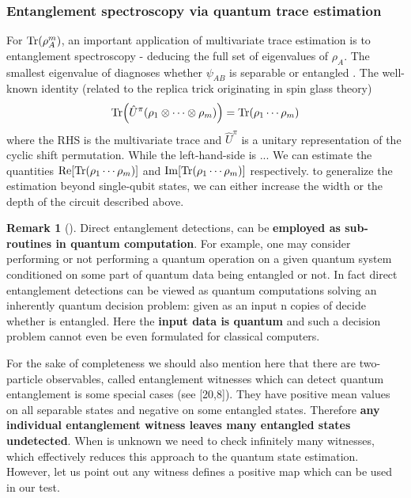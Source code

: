 \documentclass[
10pt,
aps,
pra,
linenumbers,
floatfix,
]{revtex4-2}
\theoremstyle{plain}
\theoremstyle{definition}
\newtheorem{remark}{Remark}
\newcommand{\U}{\hat{U}}
\newcommand{\dm}{\rho}
\begin{document}
\subsubsection{Entanglement spectroscopy via quantum trace estimation}
For $\Tr(\dm_A^m)$, an important application of multivariate trace estimation \cite{quekMultivariateTraceEstimation2022} is to entanglement spectroscopy \cite{ekertDirectEstimationsLinear2002} \cite{johriEntanglementSpectroscopyQuantum2017} \cite{elbenMixedstateEntanglementLocal2020} - deducing the full set of eigenvalues of $\dm_A$. The smallest eigenvalue of diagnoses whether $\psi_{AB}$ is separable or entangled \cite{horodeckiDirectDetectionQuantum2002}. 
The well-known identity (related to the replica trick originating in spin glass theory)
\begin{equation}
	\Tr(\U^{\pi} (\dm_1 \otimes \cdots \otimes \dm_m) ) = 
	\Tr(\dm_1\cdots \dm_m)
\end{equation}
where the RHS is the multivariate trace and $\U^{\pi}$ is a unitary representation of the cyclic shift permutation.
While the left-hand-side is ...
We can estimate the quantities $\Re [\Tr(\dm_1\cdots \dm_m)]$ and $\Im [\Tr(\dm_1\cdots \dm_m)]$ respectively.
to generalize the estimation beyond single-qubit states, we can either increase the width or the depth of the circuit described above.
\begin{remark}[\cite{horodeckiDirectDetectionQuantum2002}]
	Direct entanglement detections, can be \textbf{employed as sub-routines in quantum computation}. For example, one may consider performing or not performing a quantum operation on a given quantum system conditioned on some part of quantum data being entangled or not. In fact direct entanglement detections can be viewed as quantum computations solving an inherently quantum decision problem: given as an input n copies of decide whether is entangled. Here the \textbf{input data is quantum} and such a decision problem cannot even be even formulated for classical computers. 

	For the sake of completeness we should also mention here that there are two-particle observables, called entanglement witnesses which can detect quantum entanglement is some special cases (see [20,8]). They have positive mean values on all separable states and negative on some entangled states. Therefore \textbf{any individual entanglement witness leaves many entangled states undetected}. When is unknown we need to check inﬁnitely many witnesses, which eﬀectively reduces this approach to the quantum state estimation. However, let us point out any witness deﬁnes a positive map which can be used in our test.
\end{remark}
\end{document}
